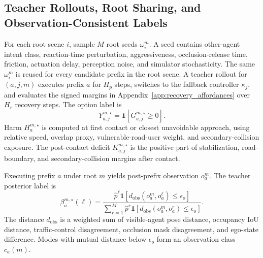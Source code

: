 \documentclass[conference]{IEEEtran}
\begin{document}
\subsection{Teacher Rollouts, Root Sharing, and Observation-Consistent Labels}
\label{app:teacher_labels_new}

For each root scene $i$, sample $M$ root seeds $\omega_i^m$.  A seed contains other-agent intent class, reaction-time perturbation, aggressiveness, occlusion-release time, friction, actuation delay, perception noise, and simulator stochasticity.  The same $\omega_i^m$ is reused for every candidate prefix in the root scene.  A teacher rollout for $(a,j,m)$ executes prefix $a$ for $H_p$ steps, switches to the fallback controller $\kappa_j$, and evaluates the signed margins in Appendix~\ref{app:recovery_affordances} over $H_r$ recovery steps.  The option label is
\begin{equation}
\label{eq:app_option_label_new}
    Y_{a,j}^{m,\star}=\mathbf 1[G_{a,j}^{m,\star}\ge0].
\end{equation}
Harm $H_a^{m,\star}$ is computed at first contact or closest unavoidable approach, using relative speed, overlap proxy, vulnerable-road-user weight, and secondary-collision exposure.  The post-contact deficit $K_{a,j}^{m,\star}$ is the positive part of stabilization, road-boundary, and secondary-collision margins after contact.

Executing prefix $a$ under root $m$ yields post-prefix observation $o_a^m$.  The teacher posterior label is
\begin{equation}
\label{eq:app_posterior_label_new}
    \beta_{a}^{m,\star}(\ell)=
    \frac{\hat p^\ell\mathbf 1[d_{\mathrm{obs}}(o_a^m,o_a^\ell)\le\epsilon_o]}
    {\sum_{r=1}^{M}\hat p^r\mathbf 1[d_{\mathrm{obs}}(o_a^m,o_a^r)\le\epsilon_o]}.
\end{equation}
The distance $d_{\mathrm{obs}}$ is a weighted sum of visible-agent pose distance, occupancy IoU distance, traffic-control disagreement, occlusion mask disagreement, and ego-state difference.  Modes with mutual distance below $\epsilon_o$ form an observation class $c_a(m)$.
\end{document}
